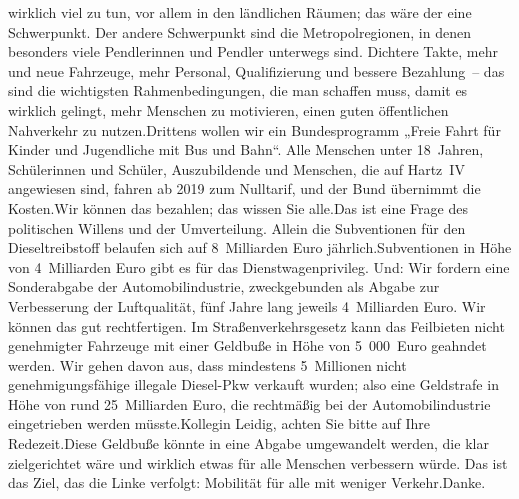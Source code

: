 \documentclass{article}
\begin{document}
wirklich viel zu tun, vor allem in den ländlichen Räumen; das wäre der eine Schwerpunkt. Der andere Schwerpunkt sind die Metropolregionen, in denen besonders viele Pendlerinnen und Pendler unterwegs sind. Dichtere Takte, mehr und neue Fahrzeuge, mehr Personal, Qualifizierung und bessere Bezahlung – das sind die wichtigsten Rahmenbedingungen, die man schaffen muss, damit es wirklich gelingt, mehr Menschen zu motivieren, einen guten öffentlichen Nahverkehr zu nutzen.Drittens wollen wir ein Bundesprogramm „Freie Fahrt für Kinder und Jugendliche mit Bus und Bahn“. Alle Menschen unter 18 Jahren, Schülerinnen und Schüler, Auszubildende und Menschen, die auf Hartz IV angewiesen sind, fahren ab 2019 zum Nulltarif, und der Bund übernimmt die Kosten.Wir können das bezahlen; das wissen Sie alle.Das ist eine Frage des politischen Willens und der Umverteilung. Allein die Subventionen für den Dieseltreibstoff belaufen sich auf 8 Milliarden Euro jährlich.Subventionen in Höhe von 4 Milliarden Euro gibt es für das Dienstwagenprivileg. Und: Wir fordern eine Sonderabgabe der Automobilindustrie, zweckgebunden als Abgabe zur Verbesserung der Luftqualität, fünf Jahre lang jeweils 4 Milliarden Euro. Wir können das gut rechtfertigen. Im Straßenverkehrsgesetz kann das Feilbieten nicht genehmigter Fahrzeuge mit einer Geldbuße in Höhe von 5 000 Euro geahndet werden. Wir gehen davon aus, dass mindestens 5 Millionen nicht genehmigungsfähige illegale Diesel-Pkw verkauft wurden; also eine Geldstrafe in Höhe von rund 25 Milliarden Euro, die rechtmäßig bei der Automobilindustrie eingetrieben werden müsste.Kollegin Leidig, achten Sie bitte auf Ihre Redezeit.Diese Geldbuße könnte in eine Abgabe umgewandelt werden, die klar zielgerichtet wäre und wirklich etwas für alle Menschen verbessern würde. Das ist das Ziel, das die Linke verfolgt: Mobilität für alle mit weniger Verkehr.Danke.
\end{document}
